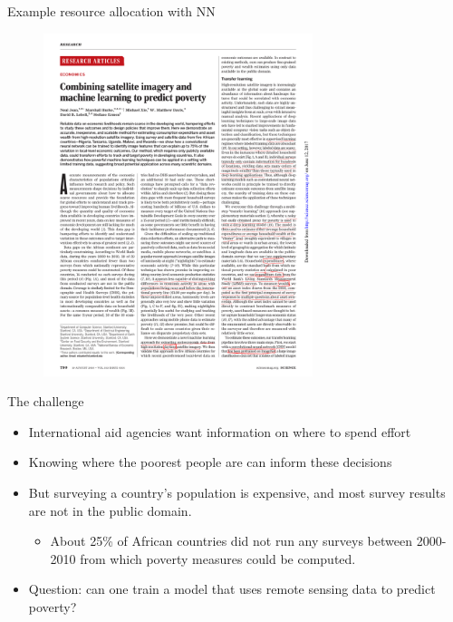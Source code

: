 \documentclass[mathserif, aspectratio=169]{beamer}
\begin{document}
\begin{frame}{Example resource allocation with NN}
\begin{figure}
\includegraphics[width=0.7\textwidth]{jean_header}
\caption*{}
\end{figure}
\end{frame}

\begin{frame}{The challenge}

\begin{itemize}
\item International aid agencies want information on where to spend effort
\item Knowing where the poorest people are can inform these decisions
\item But surveying a country's population is expensive, and most survey results are not in the public domain.  
\begin{itemize}
\item About 25\% of African countries did not run any surveys between 2000-2010 from which poverty measures could be computed. 
\end{itemize}
\item Question: can one train a model that uses remote sensing data to predict poverty?
\end{itemize}

\end{frame}
\end{document}
